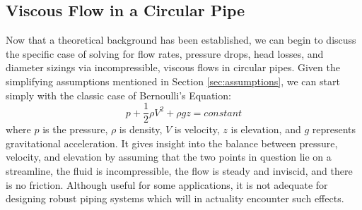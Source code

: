 \documentclass[10pt]{article} %
\numberwithin{equation}{section} %
\begin{document}
\begin{multicols}{2}
\subsection{Viscous Flow in a Circular Pipe}

Now that a theoretical background has been established, we can begin to discuss the specific case of solving for flow rates, pressure drops, head losses, and diameter sizings via incompressible, viscous flows in circular pipes. Given the simplifying assumptions mentioned in Section \ref{sec:assumptions}, we can start simply with the classic case of Bernoulli's Equation:
\begin{equation} \label{eq:bernoulli}
p + \frac{1}{2} \rho V^{2} + \rho g z = constant
\end{equation}
where $p$ is the pressure, $\rho$ is density, $V$ is velocity, $z$ is elevation, and $g$ represents gravitational acceleration. It gives insight into the balance between pressure, velocity, and elevation by assuming that the two points in question lie on a streamline, the fluid is incompressible, the flow is steady and inviscid, and there is no friction. Although useful for some applications, it is not adequate for designing robust piping systems which will in actuality encounter such effects.


\end{multicols}
\end{document}
